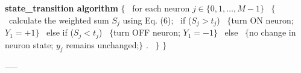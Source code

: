 \begin{algorithm}
{\bf state\_transition algorithm} $\{$
\        for each neuron $j\in\{0,1,\ldots,M-1\}$
\        $\{$   
\            calculate the weighted sum $S_j$ using Eq. (6);
\            if ($S_j>t_j$)
\                    $\{$turn ON neuron; $Y_1=+1\}$   
\            else if ($S_j<t_j$)
\                    $\{$turn OFF neuron; $Y_1=-1\}$   
\            else
\                    $\{$no change in neuron state; $y_j$ remains %
unchanged;$\}$ .
\        $\}$   
$\}$   
\end{algorithm}

-----




